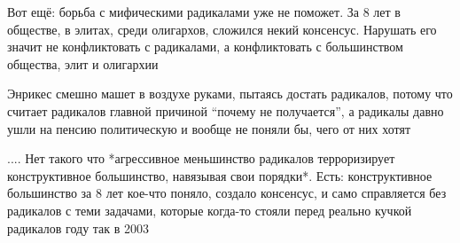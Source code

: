 \begin{itemize}
Вот ещё: борьба с мифическими радикалами уже не поможет. За 8 лет в обществе, в
элитах, среди олигархов, сложился некий консенсус. Нарушать его значит не
конфликтовать с радикалами, а конфликтовать с большинством общества, элит и
олигархии

Энрикес смешно машет в воздухе руками, пытаясь достать радикалов, потому что
считает радикалов главной причиной \enquote{почему не получается}, а радикалы давно
ушли на пенсию политическую и вообще не поняли бы, чего от них хотят

....  Нет такого что *агрессивное меньшинство радикалов терроризирует
конструктивное большинство, навязывая свои порядки*. Есть: конструктивное
большинство за 8 лет кое-что поняло, создало консенсус, и само справляется без
радикалов с теми задачами, которые когда-то стояли перед реально кучкой
радикалов году так в 2003


\end{itemize} %
